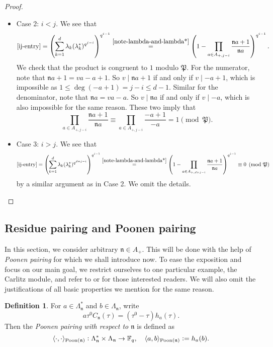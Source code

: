 \documentclass[11pt]{amsart}
\theoremstyle{plain}
\theoremstyle{definition}
\newtheorem{defn}[thm]{Definition}
\theoremstyle{remark}
\numberwithin{equation}{section}
\newcommand{\FF}{\mathbb{F}}
\newcommand{\nfk}{\mathfrak{n}}
\newcommand{\Pfk}{\mathfrak{P}}
\newcommand{\ang}[1]{\langle #1 \rangle}
\newcommand{\Fq}{\FF_q}
\begin{document}
\begin{proof}
\begin{itemize}
			\item Case 2: $i<j$.
			We see that
			$$
			\eqref{ij-entry}
			= \left( \sum_{k=1}^d \lambda_k (\lambda_k^*)^{q^{j-i}} \right)^{q^{i-1}}      
			\overset{\eqref{note-lambda-and-lambda*}}{=} \left( 1 - \prod_{a\in A_{+,j-i}} \frac{\nfk a+1}{\nfk a} \right)^{q^{i-1}}.
			$$
			We check that the product is congruent to $1$ modulo $\Pfk$.
			For the numerator, note that $\nfk a+1 = v a-a+1$.
			So $v \mid \nfk a+1$ if and only if $v \mid -a+1$, which is impossible as $1 \leq \deg(-a+1) = j-i \leq d-1$.
			Similar for the denominator, note that $\nfk a = v a-a$.
			So $v \mid \nfk a$ if and only if $v \mid -a$, which is also impossible for the same reason.
			These two imply that
			$$
			\prod_{a\in A_{+,j-i}} \frac{\nfk a+1}{\nfk a}
			\equiv \prod_{a\in A_{+,j-i}} \frac{-a+1}{-a} = 1 \pmod{\Pfk}.
			$$
			
			\item Case 3: $i>j$.
			We see that
			$$
			\eqref{ij-entry}
			= \left( \sum_{k=1}^d \lambda_k
			(\lambda_k^*)^{q^{d+j-i}} \right)^{q^{i-1}}
			\overset{\eqref{note-lambda-and-lambda*}}{=} \left( 1 - \prod_{a\in A_{+,d+j-i}} \frac{\nfk a+1}{\nfk a} \right)^{q^{i-1}}
			\equiv 0 \pmod{\Pfk}
			$$
			by a similar argument as in Case 2.
			We omit the details.
		\end{itemize}
	\end{proof}
	
	\subsection{Residue pairing and Poonen pairing}    \label{section-residue-pairing-and-poonen-pairing}
	
	In this section, we consider arbitrary $\nfk \in A_+$.
	This will be done with the help of \textit{Poonen pairing} for which we shall introduce now.
	To ease the exposition and focus on our main goal, we restrict ourselves to one particular example, the Carlitz module, and refer to \cite{poonen1996fractional} or \cite[Subsection 4.14]{goss1996basic} for those interested readers.
	We will also omit the justifications of all basic properties we mention for the same reason.
	
	\begin{defn}   \label{definition-of-poonen-pairing}
		For $a\in \Lambda_\nfk^*$ and $b\in \Lambda_\nfk$, write
		$$
		a\tau^0 C_\nfk(\tau) = (\tau^0 - \tau)h_a(\tau).
		$$
		Then the \textit{Poonen pairing with respect to $\nfk$} is defined as
		$$
		\ang{\cdot,\cdot}_{\textnormal{Poon}(\nfk)}: \Lambda_\nfk^* \times \Lambda_\nfk \to \Fq, \quad \ang{a,b}_{\textnormal{Poon}(\nfk)} := h_a(b).
		$$
	\end{defn}
	
\end{document}
